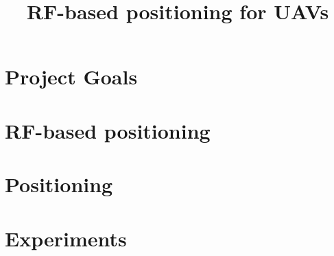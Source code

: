 \documentclass[12pt,oneside,a4paper,english]{article}
\title{RF-based positioning for UAVs} %
\begin{document}


\newpage
\doublespacing
\renewcommand{\baselinestretch}{1}\normalsize
\tableofcontents
\renewcommand{\baselinestretch}{1}\normalsize
\thispagestyle{fancy} %

\newpage
{}

\section{Project Goals} \label{ch1}


\newpage

\section{RF-based positioning} \label{ch2}


\newpage

\section{Positioning} \label{ch3}


\newpage

\section{Experiments} \label{ch4}


\label{EndOfText}

\newpage
{}



\label{endOfDoc}
\end{document}
